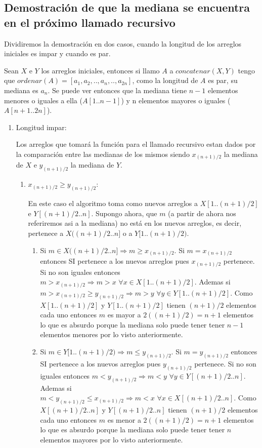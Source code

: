 \documentclass[a4paper,11pt] {article}
\begin{document}
\subsection*{Demostraci\'on de que la mediana se encuentra en el pr\'oximo llamado recursivo}

Dividiremos la demostraci\'on en dos casos, cuando la longitud de los arreglos iniciales es impar y cuando es par.

Sean $X$ e $Y$ los arreglos iniciales, entonces si llamo $A$ a $concatenar(X,Y)$ tengo que $ordenar(A)=[a_{1},a_{2},..,a_{n},..,a_{2n}]$, como la longitud de $A$ es par, su mediana es $a_{n}$. Se puede ver entonces que la mediana tiene $n-1$ elementos menores o iguales a ella ($A[1..n-1]$) y n elementos mayores o iguales ($A[n+1..2n]$).

\begin{enumerate}
 \item Longitud impar:
  
Los arreglos que tomar\'a la funci\'on para el llamado recursivo estan dados por la comparaci\'on entre las medianas de los mismos siendo $x_{(n+1)/2}$ la mediana de $X$ e $y_{(n+1)/2}$ la mediana de $Y$.
\begin{enumerate}
\item $x_{(n+1)/2}\geq y_{(n+1)/2}$:

En este caso el algoritmo toma como nuevos arreglos a $X[1..(n+1)/2]$ e $Y[(n+1)/2..n]$. Supongo ahora, que $m$ (a partir de ahora nos referiremos asi a la mediana) no est\'a en los nuevos arreglos, es decir, pertenece a $X((n+1)/2..n]$ o a $Y[1..(n+1)/2)$.
\begin{enumerate}
\item
 Si $m \in X((n+1)/2..n] \Longrightarrow m \geq x_{(n+1)/2}$. Si $m=x_{(n+1)/2}$ entonces SI pertenece a los nuevos arreglos pues $x_{(n+1)/2}$ pertenece. Si no son iguales entonces $m>x_{(n+1)/2} \Longrightarrow m>x \,\,\forall x \in X[1..(n+1)/2]$. Ademas si $m>x_{(n+1)/2}\geq y_{(n+1)/2} \Longrightarrow m>y \,\,\forall y \in Y[1..(n+1)/2]$. Como $X[1..(n+1)/2]$ y $Y[1..(n+1)/2]$ tienen $(n+1)/2$ elementos cada uno entonces $m$ es mayor a $2((n+1)/2)=n+1$ elementos lo que es absurdo porque la mediana solo puede tener tener $n-1$ elementos menores por lo visto anteriormente.
\item
 Si $m \in Y[1..(n+1)/2) \Longrightarrow m \leq y_{(n+1)/2}$. Si $m=y_{(n+1)/2}$ entonces SI pertenece a los nuevos arreglos pues $y_{(n+1)/2}$ pertenece. Si no son iguales entonces $m<y_{(n+1)/2} \Longrightarrow m<y \,\,\forall y \in Y[(n+1)/2..n]$. Ademas si $m<y_{(n+1)/2}\leq x_{(n+1)/2} \Longrightarrow m<x \,\,\forall x \in X[(n+1)/2..n]$. Como $X[(n+1)/2..n]$ y $Y[(n+1)/2..n]$ tienen $(n+1)/2$ elementos cada uno entonces $m$ es menor a $2((n+1)/2)=n+1$ elementos lo que es absurdo porque la mediana solo puede tener tener $n$ elementos mayores por lo visto anteriormente.
\end{enumerate}


\end{enumerate}
\end{enumerate}
\end{document}
